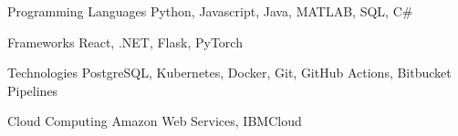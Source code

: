 
\begin{cvskills}
  \cvskill 
    {Programming Languages}
    {Python, Javascript, Java, MATLAB, SQL, C\#}

  \cvskill
    {Frameworks}
    {React, .NET, Flask, PyTorch}

    \cvskill 
    {Technologies}
    {PostgreSQL, Kubernetes, Docker, Git, GitHub Actions, Bitbucket Pipelines}



    \cvskill 
    {Cloud Computing}
    {Amazon Web Services, IBMCloud}

\end{cvskills}

